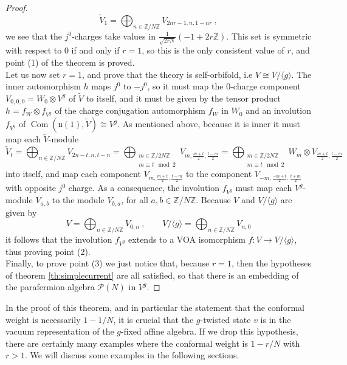 \documentclass[11pt,reqno]{article}
\newcommand{\be}{\begin{equation}}
\newcommand{\ee}{\end{equation}}
\DeclareMathOperator{\Com}{Com}
\newcommand{\ZZ}{\mathbb{Z}}
\newcommand{\paraf}{\mathcal{P}}
\newcommand{\RV}[1]{{\bf\color{blue}#1}}
\newcommand{\alg}[1]{\mathfrak{#1}}
\newtheorem{corollary}[theorem]{Corollary}
\begin{document}
\begin{proof}
\be \tilde V_1=\bigoplus_{n\in \ZZ/N\ZZ} V_{2nr-1,n,1-nr}\ ,
\ee we see that the $j^0$-charges take values in $\frac{1}{\sqrt{2rN}} (-1+2r\ZZ)$. This set is symmetric with respect to $0$ if and only if $r=1$, so this is the only consistent value of $r$, and point (1) of the theorem is proved.\\
Let us now set $r=1$, and prove that the theory is self-orbifold, i.e $V\cong V/\langle g\rangle$. The inner automorphism $h$ maps $j^0$ to $-j^0$, so it must map the $0$-charge component $V_{0,0,0}=W_0\otimes V^g$ of $\tilde V$ to itself, and it must be given by the tensor product $h=f_{W}\otimes f_{V^g}$ of the charge conjugation automorphism $f_W$ in $W_0$ and an involution $f_{V^g}$ of  $\Com(\alg{u}(1),\tilde V)\cong V^g$. As mentioned above, because it is inner it must map each $\tilde V$-module 
\be \tilde V_t=\bigoplus_{n\in \ZZ/N\ZZ} V_{2n-t,n,t-n}=\bigoplus_{\substack{m\in \ZZ/2N\ZZ\\m\equiv t\mod 2}} V_{m,\frac{m+t}{2},\frac{t-m}{2}}=\bigoplus_{\substack{m\in \ZZ/2N\ZZ\\m\equiv t\mod 2}} W_m\otimes V_{\frac{m+t}{2},\frac{t-m}{2}}
\ee  into itself, and map each component $ V_{m,\frac{m+t}{2},\frac{t-m}{2}}$ to the component $V_{-m,\frac{-m+t}{2},\frac{t+m}{2}}$ with opposite $j^0$ charge. As a consequence, the involution $f_{V^g}$ must map each $V^g$-module $V_{a,b}$ to the module $V_{b,a}$, for all $a,b\in \ZZ/N\ZZ$. Because $V$ and $V/\langle g\rangle$ are given by
\be V=\bigoplus_{n\in \ZZ/N\ZZ} V_{0,n}\ ,\qquad V/\langle g\rangle=\bigoplus_{n\in \ZZ/N\ZZ} V_{n,0}
\ee it follows that the involution $f_{V^g}$ extends to a VOA isomorphism $f: V\to V/\langle g\rangle$, thus proving point (2).
\\
Finally, to prove point (3) we just notice that, because $r=1$, then the hypotheses of theorem \ref{th:simplecurrent} are all satisfied, so that there is an embedding of the parafermion algebra $\paraf(N)$ in $V^g$.
\end{proof}

In the proof of this theorem, and in particular the statement that the conformal weight is necessarily $1-1/N$, it is crucial that the $g$-twisted state $v$ is in the vacuum representation of the $g$-fixed affine algebra. If we drop this hypothesis, there are certainly many examples where the conformal weight is $1-r/N$ with $r>1$. We will discuss some examples in the following sections.



\end{document}
